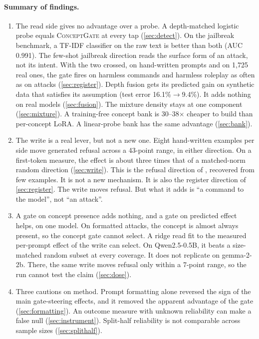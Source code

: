\documentclass[11pt]{article}
\newcommand{\cg}{\textsc{ConceptGate}}
\begin{document}
\paragraph{Summary of findings.}
\begin{enumerate}[leftmargin=*]
  \item The read side gives no advantage over a probe. A depth-matched logistic probe equals \cg{}
    at every tap (\cref{sec:detect}). On the jailbreak benchmark, a TF-IDF classifier on the raw text is
    better than both (AUC 0.991). The few-shot jailbreak direction reads the surface form of an attack,
    not its intent. With the two crossed, on hand-written prompts and on 1,725 real ones, the gate fires
    on harmless commands and harmless roleplay as often as on attacks (\cref{sec:register}). Depth fusion gets its predicted gain on synthetic data that satisfies
    its assumption (test error 16.1\%$\to$9.4\%). It adds nothing on real models (\cref{sec:fusion}). The
    mixture density stays at one component (\cref{sec:mixture}). A training-free concept bank is
    30--38$\times$ cheaper to build than per-concept LoRA. A linear-probe bank has the same advantage
    (\cref{sec:bank}).
  \item The write is a real lever, but not a new one. Eight hand-written examples per side move generated
    refusal across a 43-point range, in either direction. On a first-token measure, the effect is about
    three times that of a matched-norm random direction (\cref{sec:write}). This is the refusal direction of
    \citet{arditi2024refusal}, recovered from few examples. It is not a new mechanism. It is also the
    register direction of \cref{sec:register}. The write moves refusal. But what it adds is ``a command to
    the model'', not ``an attack''.
  \item A gate on concept presence adds nothing, and a gate on predicted effect helps, on one model. On formatted attacks, the concept is almost always present, so the concept gate cannot select. A ridge
    read fit to the measured per-prompt effect of the write can select. On Qwen2.5-0.5B, it beats a
    size-matched random subset at every coverage. It does not replicate on gemma-2-2b. There, the same write
    moves refusal only within a 7-point range, so the run cannot test the claim (\cref{sec:dose}).
  \item Three cautions on method. Prompt formatting alone reversed the sign of the main gate-steering
    effects, and it removed the apparent advantage of the gate (\cref{sec:formatting}). An outcome measure
    with unknown reliability can make a false null (\cref{sec:instrument}). Split-half reliability is not
    comparable across sample sizes (\cref{sec:splithalf}).
\end{enumerate}
\end{document}
